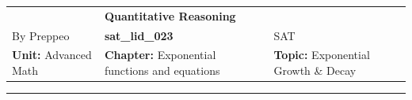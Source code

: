 \documentclass[11pt,paper=a4,answers]{exam}
\begin{document}
\begin{center}
    \centering
    \renewcommand{\arraystretch}{1.5}
    \begin{tabularx}{\textwidth}{YYY}
    & \normalsize\bf{{\Large{{Quantitative Reasoning}}}} & \\
    By Preppeo & \normalsize\bf{{sat\_lid\_023}} & SAT\\
    \normalsize{{\textbf{{Unit:}} Advanced Math}} & \normalsize{{\textbf{{Chapter:}} Exponential functions and equations}} & \normalsize{{\textbf{{Topic:}} Exponential Growth \& Decay}} \\
    \end{tabularx}
\end{center}
\par\noindent\rule{\textwidth}{1pt}
\end{document}
